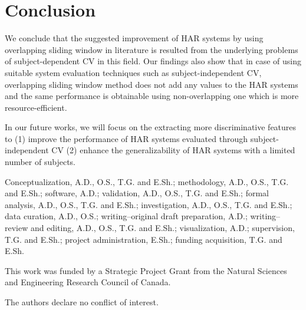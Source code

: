 \documentclass[sensors,article,submit,moreauthors,pdftex]{Definitions/mdpi}
\newcommand{\TG}[1]{\color{red}\textbf{From Dr.Glatard}: #1\color{black}}
\begin{document}


\section{Conclusion} \label{sec:conclusion}
We conclude that the suggested improvement of HAR systems by using overlapping sliding window in literature is resulted from the underlying problems of subject-dependent CV in this field. Our findings also show that in case of using suitable system evaluation techniques such as subject-independent CV, overlapping sliding window method does not add any values to the HAR systems and the same performance is obtainable using non-overlapping one which is more resource-efficient.

In our future works, we will focus on the extracting more discriminative features to (1) improve the performance of HAR systems evaluated through subject-independent CV (2) enhance the generalizability of HAR systems with a limited number of subjects.  




\vspace{6pt} 
\authorcontributions{}
Conceptualization, A.D., O.S., T.G. and E.Sh.; methodology, A.D., O.S., T.G. and E.Sh.; software, A.D.; validation, A.D., O.S., T.G. and E.Sh.; formal analysis, A.D., O.S., T.G. and E.Sh.; investigation, A.D., O.S., T.G. and E.Sh.; data curation, A.D., O.S.; writing--original draft preparation, A.D.; writing--review and editing, A.D., O.S., T.G. and E.Sh.; visualization, A.D.; supervision, T.G. and E.Sh.; project administration, E.Sh.; funding acquisition, T.G. and E.Sh.

\funding{}

This work was funded by a Strategic Project Grant from the Natural Sciences and Engineering Research Council of Canada.


\conflictsofinterest{}
The authors declare no conflict of interest.

\end{document}
